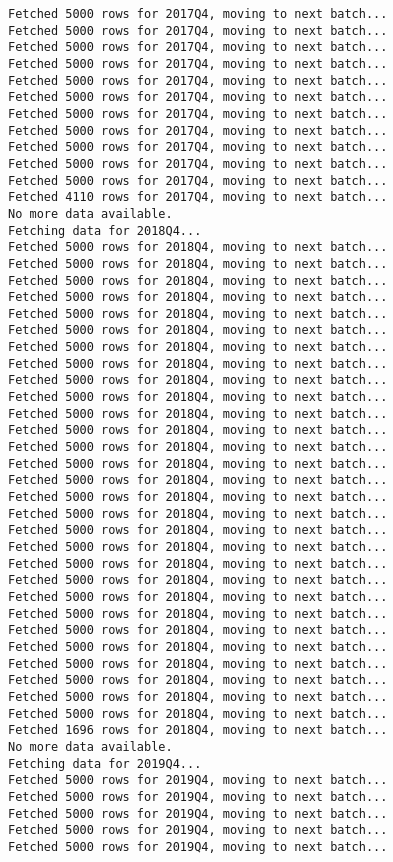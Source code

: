 \documentclass[
  letterpaper,
  DIV=11,
  numbers=noendperiod]{scrartcl}
\begin{document}
\begin{verbatim}
Fetched 5000 rows for 2017Q4, moving to next batch...
Fetched 5000 rows for 2017Q4, moving to next batch...
Fetched 5000 rows for 2017Q4, moving to next batch...
Fetched 5000 rows for 2017Q4, moving to next batch...
Fetched 5000 rows for 2017Q4, moving to next batch...
Fetched 5000 rows for 2017Q4, moving to next batch...
Fetched 5000 rows for 2017Q4, moving to next batch...
Fetched 5000 rows for 2017Q4, moving to next batch...
Fetched 5000 rows for 2017Q4, moving to next batch...
Fetched 5000 rows for 2017Q4, moving to next batch...
Fetched 5000 rows for 2017Q4, moving to next batch...
Fetched 4110 rows for 2017Q4, moving to next batch...
No more data available.
Fetching data for 2018Q4...
Fetched 5000 rows for 2018Q4, moving to next batch...
Fetched 5000 rows for 2018Q4, moving to next batch...
Fetched 5000 rows for 2018Q4, moving to next batch...
Fetched 5000 rows for 2018Q4, moving to next batch...
Fetched 5000 rows for 2018Q4, moving to next batch...
Fetched 5000 rows for 2018Q4, moving to next batch...
Fetched 5000 rows for 2018Q4, moving to next batch...
Fetched 5000 rows for 2018Q4, moving to next batch...
Fetched 5000 rows for 2018Q4, moving to next batch...
Fetched 5000 rows for 2018Q4, moving to next batch...
Fetched 5000 rows for 2018Q4, moving to next batch...
Fetched 5000 rows for 2018Q4, moving to next batch...
Fetched 5000 rows for 2018Q4, moving to next batch...
Fetched 5000 rows for 2018Q4, moving to next batch...
Fetched 5000 rows for 2018Q4, moving to next batch...
Fetched 5000 rows for 2018Q4, moving to next batch...
Fetched 5000 rows for 2018Q4, moving to next batch...
Fetched 5000 rows for 2018Q4, moving to next batch...
Fetched 5000 rows for 2018Q4, moving to next batch...
Fetched 5000 rows for 2018Q4, moving to next batch...
Fetched 5000 rows for 2018Q4, moving to next batch...
Fetched 5000 rows for 2018Q4, moving to next batch...
Fetched 5000 rows for 2018Q4, moving to next batch...
Fetched 5000 rows for 2018Q4, moving to next batch...
Fetched 5000 rows for 2018Q4, moving to next batch...
Fetched 5000 rows for 2018Q4, moving to next batch...
Fetched 5000 rows for 2018Q4, moving to next batch...
Fetched 5000 rows for 2018Q4, moving to next batch...
Fetched 5000 rows for 2018Q4, moving to next batch...
Fetched 1696 rows for 2018Q4, moving to next batch...
No more data available.
Fetching data for 2019Q4...
Fetched 5000 rows for 2019Q4, moving to next batch...
Fetched 5000 rows for 2019Q4, moving to next batch...
Fetched 5000 rows for 2019Q4, moving to next batch...
Fetched 5000 rows for 2019Q4, moving to next batch...
Fetched 5000 rows for 2019Q4, moving to next batch...

\end{verbatim}
\end{document}
